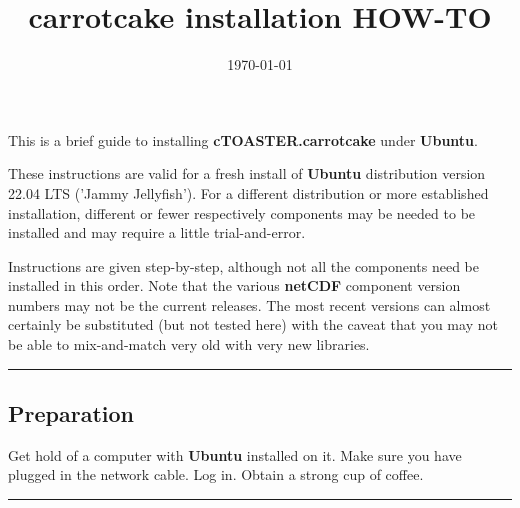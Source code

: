 \documentclass[10pt,twoside]{article}
\title{carrotcake installation HOW-TO\vspace{-8mm}}
\author{}
\date{\today}
\begin{document}

\maketitle


\noindent This is a brief guide to installing \textbf{cTOASTER.carrotcake} under \textbf{Ubuntu}. 

These instructions are valid for a fresh install of \textbf{Ubuntu} distribution version 22.04 LTS ('Jammy Jellyfish'). For a different distribution or more established installation, different or fewer respectively components may be needed to be installed and may require a little trial-and-error.

Instructions are given step-by-step, although not all the components need be installed in this order. Note that the various \textbf{netCDF} component version numbers may not be the current releases. The most recent versions can almost certainly be substituted (but not tested here) with the caveat that you may not be able to mix-and-match very old with very new libraries.

\vspace{1mm}
\noindent\rule{4cm}{0.1mm}

\subsection{Preparation}
\vspace{1mm}

Get hold of a computer with \textbf{Ubuntu} installed on it. Make sure you have plugged in the network cable. Log in. Obtain a strong cup of coffee.

\vspace{1mm}
\noindent\rule{4cm}{0.1mm}
\end{document}
